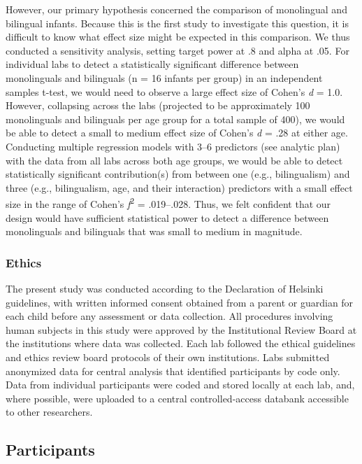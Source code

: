 \documentclass[english,,man,floatsintext]{apa6}
\begin{document}
However, our primary hypothesis concerned the comparison of monolingual and bilingual infants. Because this is the first study to investigate this question, it is difficult to know what effect size might be expected in this comparison. We thus conducted a sensitivity analysis, setting target power at .8 and alpha at .05. For individual labs to detect a statistically significant difference between monolinguals and bilinguals (n = 16 infants per group) in an independent samples t-test, we would need to observe a large effect size of Cohen's \emph{d} = 1.0. However, collapsing across the labs (projected to be approximately 100 monolinguals and bilinguals per age group for a total sample of 400), we would be able to detect a small to medium effect size of Cohen's \emph{d} = .28 at either age. Conducting multiple regression models with 3--6 predictors (see analytic plan) with the data from all labs across both age groups, we would be able to detect statistically significant contribution(s) from between one (e.g., bilingualism) and three (e.g., bilingualism, age, and their interaction) predictors with a small effect size in the range of Cohen's \emph{ƒ}\textsuperscript{2} = .019--.028. Thus, we felt confident that our design would have sufficient statistical power to detect a difference between monolinguals and bilinguals that was small to medium in magnitude.

\hypertarget{ethics}{%
\subsubsection{Ethics}\label{ethics}}

The present study was conducted according to the Declaration of Helsinki guidelines, with written informed consent obtained from a parent or guardian for each child before any assessment or data collection. All procedures involving human subjects in this study were approved by the Institutional Review Board at the institutions where data was collected. Each lab followed the ethical guidelines and ethics review board protocols of their own institutions. Labs submitted anonymized data for central analysis that identified participants by code only. Data from individual participants were coded and stored locally at each lab, and, where possible, were uploaded to a central controlled-access databank accessible to other researchers.

\hypertarget{participants}{%
\subsection{Participants}\label{participants}}
\end{document}
